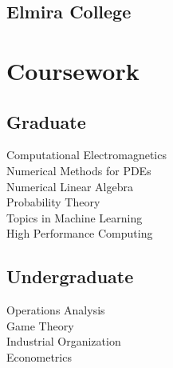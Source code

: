\documentclass[letterpaper]{pine-resume} %
\begin{document}
\begin{minipage}[t]{0.33\textwidth}

\sectionspace %


\sectionspace %


\subsection{Elmira College}



\sectionspace %


\section{Coursework}

\subsection{Graduate}
Computational Electromagnetics \\
Numerical Methods for PDEs \\
Numerical Linear Algebra \\
Probability Theory \\
Topics in Machine Learning \\
High Performance Computing

\sectionspace %


\subsection{Undergraduate}
Operations Analysis \\
Game Theory \\
Industrial Organization \\
Econometrics \\


\end{minipage}
\end{document}
